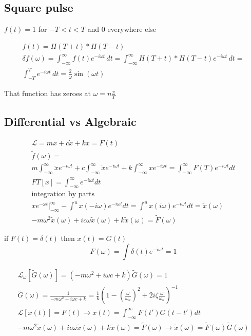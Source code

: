\documentclass[fleqn]{report}
\newcommand{\equations} [1] {
\begin{gather*}
#1
\end{gather*}
}
\begin{document}
\subsection{Square pulse}
$f(t) = 1$ for $-T < t < T$ and 0 everywhere else 

\equations{
    f(t) = H(T + t) * H(T - t)
    \\
    \delta f(\omega) = 
    \int^{\infty}_{- \infty} f(t) e^{-i \omega t} \, dt 
    =
    \int^{\infty}_{- \infty} 
    H(T + t) * H(T - t) e^{-i \omega t} \, dt 
    =
    \\
    \int^{T}_{-T} 
    e^{-i \omega t} \, dt  
    =
    \frac{2}{\omega} \sin(\omega t)
}

That function has zeroes at $\omega = n \frac{\pi}{T}$

\subsection{Differential vs Algebraic}
\equations{
    \mathcal L = m \ddot x + c \dot x + kx = F(t)
    \\
    \tilde f(\omega) = 
    \\
    m \int^{\infty}_{- \infty} \ddot x e^{-i \omega t} +
    c \int^{\infty}_{- \infty} \dot x e^{-i \omega t} +
    k \int^{\infty}_{-\infty}  x e^{-i \omega t} =
    \int^{\infty}_{-\infty} F(T) e^{-i \omega t} dt
    \\
    FT[x] = \int^{\infty}_{-\infty} e^{- i\omega t} dt 
    \\
    \textrm{integration by parts}
    \\
    x e^{- \omega t} 
    \Big|^{\infty}_{-\infty} - 
    \int^u x (- i \omega ) e^{- i \omega t} dt 
    = 
    \int^u x (i \omega ) e^{- i \omega t} dt = \tilde x(\omega)
    \\
    -m \omega^2 \tilde x(\omega) + 
    i c \omega \tilde x(\omega)  + k \tilde x(\omega) = 
    \tilde F(\omega)
}

if $F(t) = \delta(t)$ then $x(t) = G(t)$
\[
F(\omega) = \int \delta(t) e^{- i \omega t} = 1
\]

\equations{
    \mathcal L_\omega [\tilde G(\omega)] = (-m \omega^2 + i \omega c + k) \tilde G(\omega) = 1
    \\
    \tilde G(\omega) = 
    \frac{1}{-m \omega^2 + i \omega c + k}
    =
    \frac{1}{k} \left(
        1 - (\frac{\omega}{\omega_n})^2 + 2 i \zeta \frac{\omega}{\omega_n}
    \right)^{-1}
    \\
    \mathcal L[x(t)] = F(t)
    \rightarrow 
    x(t) = \int^{\infty}_{-\infty} F(t') G(t - t') dt
    \\
    -m \omega^2 \tilde x(\omega) + 
    i c \omega \tilde x(\omega)  + k \tilde x(\omega) = 
    \tilde F(\omega)
    \rightarrow 
    \tilde x(\omega) = \tilde F(\omega) \tilde G(\omega)
}
\end{document}
